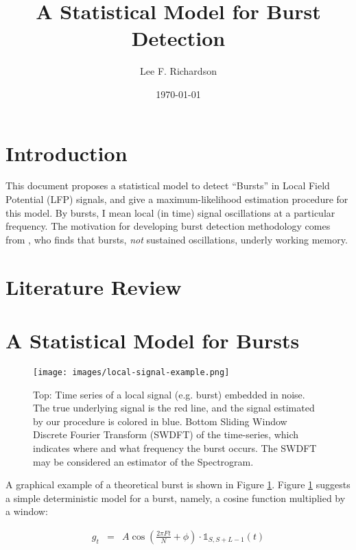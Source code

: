 \documentclass[11pt]{article}
\theoremstyle{plain}
\theoremstyle{definition}
\begin{document}
\title{{\Large A Statistical Model for Burst Detection}}
\author{Lee F. Richardson}
\date{\today}
\maketitle

\section{Introduction}
This document proposes a statistical model to detect ``Bursts'' in Local Field Potential (LFP) signals, and give a maximum-likelihood estimation procedure for this model. By bursts, I mean local (in time) signal oscillations at a particular frequency. The motivation for developing burst detection methodology comes from \cite{lundqvist2016gamma}, who finds that bursts, {\it not} sustained oscillations, underly working memory. 

\section{Literature Review}
\label{sec:lit-review}

\section{A Statistical Model for Bursts}
\label{sec:model}

\begin{figure}[!ht]
  \centering
  \texttt{[image: images/local-signal-example.png]}
  \caption{Top: Time series of a local signal (e.g. burst) embedded in noise. The true underlying signal is the red line, and the signal estimated by our procedure is colored in blue. Bottom Sliding Window Discrete Fourier Transform (SWDFT) of the time-series, which indicates where and what frequency the burst occurs. The SWDFT may be considered an estimator of the Spectrogram.}
\label{fig:theoretical-burst}
\end{figure}

A graphical example of a theoretical burst is shown in Figure \ref{fig:theoretical-burst}. Figure \ref{fig:theoretical-burst} suggests a simple deterministic model for a burst, namely, a cosine function multiplied by a window:

\begin{eqnarray}
	\label{eq:deterministic}
	g_t &=& A \cos(\frac{2 \pi F t}{N} + \phi) \cdot \mathbb{1}_{S, S + L - 1}(t)
\end{eqnarray}
\end{document}
